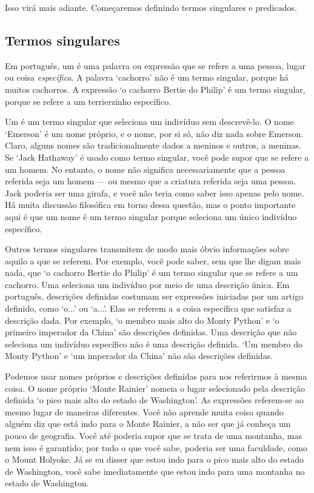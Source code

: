 Isso virá mais adiante. Começaremos definindo termos singulares e predicados.


\subsection{Termos singulares}
Em português, um  é uma palavra ou expressão que se refere a uma pessoa, lugar ou coisa \emph{específica}. A palavra `cachorro' não é um termo singular, porque há muitos cachorros. A expressão `o cachorro Bertie do Philip' é um termo singular, porque se refere a um terrierzinho específico.

Um  é um termo singular que seleciona um indivíduo sem descrevê-lo. O nome `Emerson' é um nome próprio, e o nome, por si só, não diz nada sobre Emerson. Claro, alguns nomes são tradicionalmente dados a meninos e outros, a meninas. Se `Jack Hathaway' é usado como termo singular, você pode supor que se refere a um homem. No entanto, o nome não significa necessariamente que a pessoa referida seja um homem — ou mesmo que a criatura referida seja uma pessoa. Jack poderia ser uma girafa, e você não teria como saber isso apenas pelo nome. Há muita discussão filosófica em torno dessa questão, mas o ponto importante aqui é que um nome é um termo singular porque seleciona um único indivíduo específico.

Outros termos singulares transmitem de modo mais óbvio informações sobre aquilo a que se referem. Por exemplo, você pode saber, sem que lhe digam mais nada, que `o cachorro Bertie do Philip' é um termo singular que se refere a um cachorro. Uma  seleciona um indivíduo por meio de uma descrição única. Em português, descrições definidas costumam ser expressões iniciadas por um artigo definido, como `o...' ou `a...'. Elas se referem a \emph{a} coisa específica que satisfaz a descrição dada. Por exemplo, `o membro mais alto do Monty Python' e `o primeiro imperador da China' são descrições definidas. Uma descrição que não seleciona um indivíduo específico não é uma descrição definida. `Um membro do Monty Python' e `um imperador da China' não são descrições definidas.

Podemos usar nomes próprios e descrições definidas para nos referirmos à mesma coisa. O nome próprio `Monte Rainier' nomeia o lugar selecionado pela descrição definida `o pico mais alto do estado de Washington'. As expressões referem-se ao mesmo lugar de maneiras diferentes. Você não aprende muita coisa quando alguém diz que está indo para o Monte Rainier, a não ser que já conheça um pouco de geografia. Você até poderia supor que se trata de uma montanha, mas nem isso é garantido; por tudo o que você sabe, poderia ser uma faculdade, como o Mount Holyoke. Já se eu disser que estou indo para o pico mais alto do estado de Washington, você sabe imediatamente que estou indo para uma montanha no estado de Washington.

